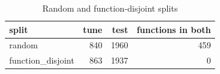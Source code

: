 \begin{table}[t]
\centering
\caption{Random and function-disjoint splits}
\label{tab:splits}
\begin{tabular}{lrrr}
\hline
split & tune & test & functions in both \\
\hline
random & 840 & 1960 & 459 \\
function\_disjoint & 863 & 1937 & 0 \\
\hline
\end{tabular}
\end{table}
